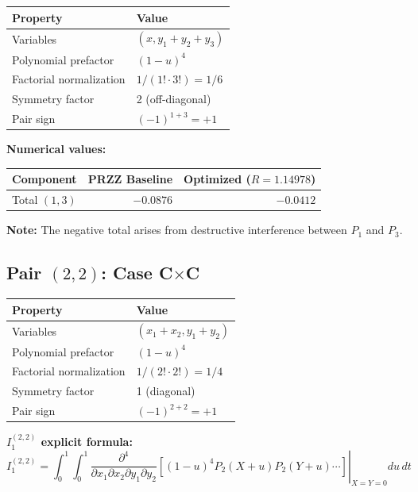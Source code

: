 \documentclass[11pt]{article}
\begin{document}
\begin{center}
\begin{tabular}{ll}
\toprule
Property & Value \\
\midrule
Variables & $(x, y_1+y_2+y_3)$ \\
Polynomial prefactor & $(1-u)^4$ \\
Factorial normalization & $1/(1! \cdot 3!) = 1/6$ \\
Symmetry factor & 2 (off-diagonal) \\
Pair sign & $(-1)^{1+3} = +1$ \\
\bottomrule
\end{tabular}
\end{center}

\textbf{Numerical values:}

\begin{center}
\begin{tabular}{lrr}
\toprule
Component & PRZZ Baseline & Optimized ($R=1.14978$) \\
\midrule
Total $(1,3)$ & $-0.0876$ & $-0.0412$ \\
\bottomrule
\end{tabular}
\end{center}

\textbf{Note:} The negative total arises from destructive interference between $P_1$ and $P_3$.

\subsection{Pair $(2,2)$: Case C$\times$C}

\begin{center}
\begin{tabular}{ll}
\toprule
Property & Value \\
\midrule
Variables & $(x_1+x_2, y_1+y_2)$ \\
Polynomial prefactor & $(1-u)^4$ \\
Factorial normalization & $1/(2! \cdot 2!) = 1/4$ \\
Symmetry factor & 1 (diagonal) \\
Pair sign & $(-1)^{2+2} = +1$ \\
\bottomrule
\end{tabular}
\end{center}

\textbf{$I_1^{(2,2)}$ explicit formula:}
\begin{equation}
I_1^{(2,2)} = \int_0^1 \int_0^1 \left.\frac{\partial^4}{\partial x_1 \partial x_2 \partial y_1 \partial y_2}\left[(1-u)^4 P_2(X+u) P_2(Y+u) \cdots\right]\right|_{X=Y=0} du\, dt
\end{equation}
\end{document}
